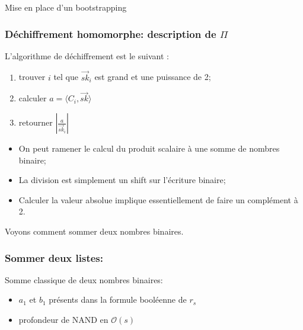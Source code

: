 \documentclass[10pt,xcolor={usenames,dvipsnames}]{beamer}
\begin{document}
\begin{section}{Mise en place d'un bootstrapping}
\begin{frame}
\end{frame} 


\begin{frame}
\frametitle{Déchiffrement homomorphe: description de $\Pi$}
L'algorithme de déchiffrement est le suivant :
\begin{enumerate}
\item trouver $i$ tel que $\vec{sk}_i$ est grand et une puissance de 2; 
\item calculer $a = \langle C_i , \vec{sk} \rangle$
\item retourner $|\frac{a}{\vec{sk}_i}|$
\end{enumerate}

\begin{itemize}
\item On peut ramener le calcul du produit scalaire à une somme de nombres binaire;
\item La division est simplement un shift sur l'écriture binaire;
\item Calculer la valeur absolue implique essentiellement de faire un complément à 2.
\end{itemize}

Voyons comment sommer deux nombres binaires.

\end{frame} 


\begin{frame} 
\frametitle{Sommer deux listes: }
Somme classique de deux nombres binaires:
  \begin{figure}
    \begin{center}
      \begin{tikzpicture}[scale = 1.2, transform shape]
      	
      \end{tikzpicture}
    \end{center}
  \end{figure}
\begin{itemize}
\item $a_1$ et $b_1$ présents dans la formule booléenne de $r_s$
\item profondeur de NAND en $\mathcal{O}(s)$
\end{itemize}
\end{frame} 
    

\end{section}
\end{document}
